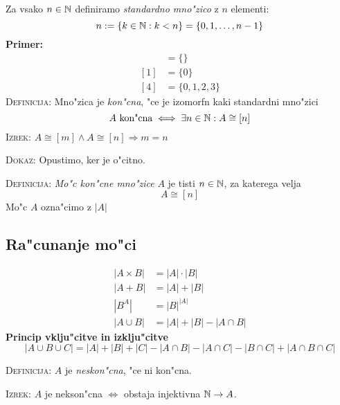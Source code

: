 Za vsako $n \in \mathbb{N}$ definiramo \emph{standardno mno"zico} z $n$ elementi:
\begin{equation*}
n := \{k \in \mathbb{N}: k < n\} = \{0, 1, \ldots, n-1\}
\end{equation*}
\textbf{Primer:}
\begin{align*}
[0] &= \{\}\\
[1] &= \{0\} \\
[4] &= \{0, 1, 2, 3\}
\end{align*}
\textsc{Definicija:} Mno"zica je \emph{kon"cna}, "ce je izomorfn kaki standardni mno"zici
\begin{equation*}
\text{$A$ kon"cna} \iff \exists n \in \mathbb{N}: A \cong [n]
\end{equation*}
\textsc{Izrek:} $A \cong [m] \land A \cong [n] \Rightarrow m = n$

\textsc{Dokaz:} Opustimo, ker je o"citno.

\textsc{Definicija:} \emph{Mo"c kon"cne mno"zice} $A$ je tisti $n \in \mathbb{N}$, za katerega velja
\begin{equation*}
A \cong [n]
\end{equation*}
Mo"c $A$ ozna"cimo z $|A|$
\subsection{Ra"cunanje mo"ci}
\begin{align*}
|A \times B| &= |A| \cdot |B| \\
|A + B|& = |A| + |B| \\
\left|B^A\right| &= |B|^{|A|} \\
|A \cup B| &= |A| + |B| - |A \cap B|
\end{align*}
\textbf{Princip vklju"citve in izklju"citve}
\begin{equation*}
|A \cup B \cup C| = |A| + |B| + |C| - |A \cap B| - |A \cap C| - |B \cap C| + |A \cap B \cap C|
\end{equation*}

\textsc{Definicija:} $A$ je \emph{neskon"cna}, "ce ni kon"cna.

\textsc{Izrek:} $A$ je nekson"cna $\iff$ obstaja injektivna $\mathbb{N} \to A$.

